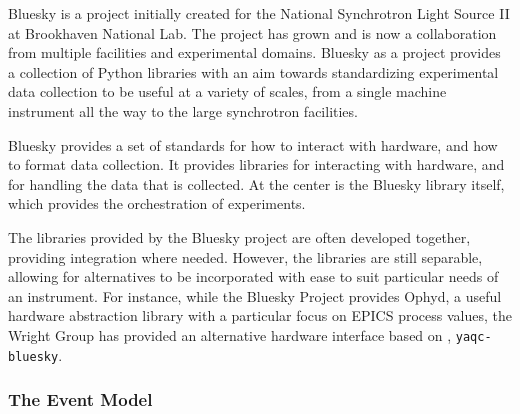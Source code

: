 
Bluesky is a project initially created for the National Synchrotron Light Source II at Brookhaven National Lab.
The project has grown and is now a collaboration from multiple facilities and experimental domains.
Bluesky as a project provides a collection of Python libraries with an aim towards standardizing experimental data collection to be useful at a variety of scales, from a single machine instrument all the way to the large synchrotron facilities.

Bluesky provides a set of standards for how to interact with hardware, and how to format data collection.
It provides libraries for interacting with hardware, and for handling the data that is collected.
At the center is the Bluesky library itself, which provides the orchestration of experiments.


The libraries provided by the Bluesky project are often developed together, providing integration where needed.
However, the libraries are still separable, allowing for alternatives to be incorporated with ease to suit particular needs of an instrument.
For instance, while the Bluesky Project provides Ophyd\cite{Lauer2020}, a useful hardware abstraction library with a particular focus on EPICS process values, the Wright Group has provided an alternative hardware interface based on \yaq{}, \texttt{yaqc-bluesky}\cite{yaqcbluesky}.

\subsubsection{The Event Model}

